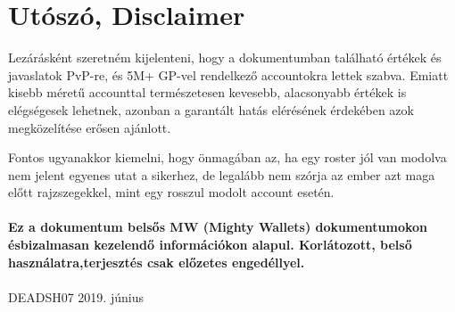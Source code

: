 \documentclass[11pt]{report}
\begin{document}
\chapter{Utószó, Disclaimer}
Lezárásként szeretném kijelenteni, hogy a dokumentumban található értékek és javaslatok PvP-re, és 5M+ GP-vel rendelkező accountokra lettek szabva. Emiatt kisebb méretű accounttal természetesen kevesebb, alacsonyabb értékek is elégségesek lehetnek, azonban a garantált hatás elérésének érdekében azok megközelítése erősen ajánlott.\par
Fontos ugyanakkor kiemelni, hogy önmagában az, ha egy roster jól van modolva nem jelent egyenes utat a sikerhez, de legalább nem szórja az ember azt maga előtt rajzszegekkel, mint egy rosszul modolt account esetén.\\
\\
\textbf{Ez a dokumentum belsős MW (Mighty Wallets) dokumentumokon ésbizalmasan kezelendő információkon alapul. Korlátozott, belső használatra,terjesztés csak előzetes engedéllyel.}\\
\\
\LARGE\textcopyright DEADSH07 2019. június
\end{document}
